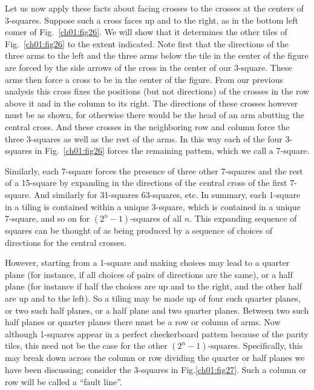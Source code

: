 \documentclass[reqno]{stml-l}
\theoremstyle{plain}
\theoremstyle{definition}
\numberwithin{equation}{chapter}
\begin{document}
Let us now apply these facts about facing crosses to the crosses at the centers of 3-squares. Suppose such a cross faces up and to the right, as in the bottom left comer of Fig.~\ref{ch01:fig26}. We will show that it determines the other tiles of Fig.~\ref{ch01:fig26} to the extent indicated. Note first that the directions of the three arms to the left and the three arms below the tile in the center of the figure are forced by the side arrows of the cross in the center of our 3-square. These arms then force a cross to be in the center of the figure. From our previous analysis this cross fixes the positions (but not directions) of the crosses in the row above it and in the column to its right. The directions of these crosses however must be as shown, for otherwise there would be the head of an arm abutting the central cross. And these crosses in the neighboring row and column force the three 3-squares as well as the rest of the arms. In this way each of the four 3-squares in Fig.~\ref{ch01:fig26} forces the remaining pattem, which we call a 7-square.

Similarly, each 7-square forces the presence of three other 7-squares and the rest of a 15-square by expanding in the directions of the central cross of the first 7-square. And similarly for 31-squares 63-squares, etc. In summary, each 1-square in a tiling is contained within a unique 3-square, which is contained in a unique 7-square, and so on for $(2^{n}-1)$-squares of all $n$. This expanding sequence of squares can be thought of as being produced by a sequence of choices of directions for the central crosses.

However, starting from a 1-square and making choices may lead to a quarter plane (for instance, if all choices of pairs of directions are the same), or a half plane (for instance if half the choices are up and to the right, and the other half are up and to the left). So a tiling may be made up of four such quarter planes, or two such half planes, or a half plane and two quarter planes. Between two such half planes or quarter planes there must be a row or column of arms. Now although 1-squares appear in a perfect checkerboard pattem because of the parity tiles, this need not be the case for the other $(2^{n}-1)$-squares. Specifically, this may break down across the column or row dividing the quarter or half planes we have been discussing; consider the 3-squares in Fig.\ref{ch01:fig27}. Such a column or row will be called a ``fault line''.
\end{document}

